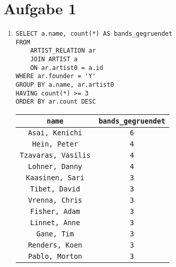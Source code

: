 \documentclass[fleqn]{article}
\begin{document}
    \section*{Aufgabe 1}
    \begin{enumerate}
        \item
            \begin{verbatim}
SELECT a.name, count(*) AS bands_gegruendet
FROM
    ARTIST_RELATION ar
    JOIN ARTIST a
    ON ar.artist0 = a.id
WHERE ar.founder = 'Y'
GROUP BY a.name, ar.artist0
HAVING count(*) >= 3
ORDER BY ar.count DESC
            \end{verbatim}
            \begin{tabular}{|c|c|}
                \texttt{name} & \texttt{bands\_gegruendet} \\
                \toprule
                \texttt{Asai, Kenichi}     & \texttt{6} \\
                \texttt{Hein, Peter}       & \texttt{4} \\
                \texttt{Tzavaras, Vasilis} & \texttt{4} \\
                \texttt{Lohner, Danny}     & \texttt{4} \\
                \texttt{Kaasinen, Sari}    & \texttt{3} \\
                \texttt{Tibet, David}      & \texttt{3} \\
                \texttt{Vrenna, Chris}     & \texttt{3} \\
                \texttt{Fisher, Adam}      & \texttt{3} \\
                \texttt{Linnet, Anne}      & \texttt{3} \\
                \texttt{Gane, Tim}         & \texttt{3} \\
                \texttt{Renders, Koen}     & \texttt{3} \\
                \texttt{Pablo, Morton}     & \texttt{3} \\
            \end{tabular}


\end{enumerate}
\end{document}
